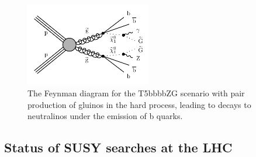 \begin{figure}[hbtp]
 \centering
 \includegraphics[width=0.49\textwidth]{figures/signal/T5bbbbZG-crop}
 \caption{The Feynman diagram for the T5bbbbZG scenario with pair production of gluinos in the hard process, leading to decays to neutralinos under the emission of b quarks.}
 \label{fig:strongSMS}
\end{figure}


\subsection{Status of SUSY searches at the LHC}
